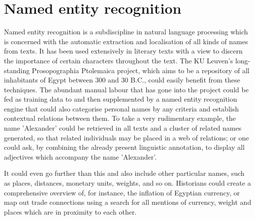 \section{Named entity recognition}
\label{sec:ner}

Named entity recognition is a subdiscipline in natural language processing
which is concerned with the automatic extraction and localisation of all kinds
of names from texts. It has been used extensively in literary texts with a view
to discern the importance of certain characters throughout the text. The KU
Leuven's long-standing Prosopographia Ptolemaica project, which aims to be a
repository of all inhabitants of Egypt between 300 and 30 B.C., could easily
benefit from these techniques. The abundant manual labour that has gone into
the project could be fed as training data to and then supplemented by a named
entity recognition engine that could also categorise personal names by any
criteria and establish contextual relations between them. To take a very
rudimentary example, the name 'Alexander' could be retrieved in all texts and a
cluster of related names generated, so that related individuals may be placed
in a web of relations; or one could ask, by combining the already present
linguistic annotation, to display all adjectives which accompany the name
'Alexander'.

It could even go further than this and also include other particular names,
such as places, distances, monetary units, weights, and so on. Historians could
create a comprehensive overview of, for instance, the inflation of Egyptian
currency, or map out trade connections using a search for all mentions of
currency, weight and places which are in proximity to each other.

